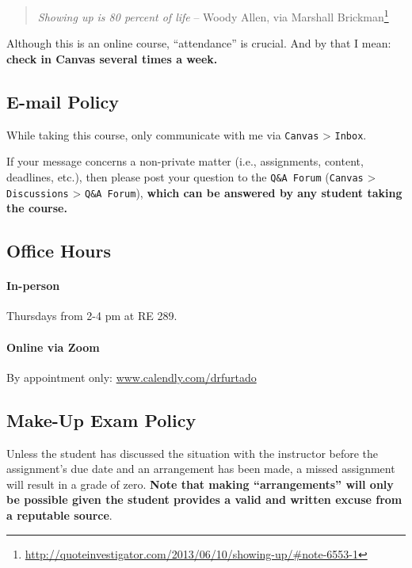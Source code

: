 \documentclass[
  letterpaper,
  DIV=11,
  numbers=noendperiod]{scrartcl}
\let\oldparagraph\paragraph
\renewcommand{\paragraph}[1]{\oldparagraph{#1}\mbox{}}
\DeclareRobustCommand{\href}[2]{#2\footnote{\url{#1}}}
\begin{document}
\begin{quote}
\emph{Showing up is 80 percent of life} -- Woody Allen,
\href{http://quoteinvestigator.com/2013/06/10/showing-up/\#note-6553-1}{via
Marshall Brickman}
\end{quote}

Although this is an online course, ``attendance'' is crucial. And by
that I mean: \textbf{check in Canvas several times a week.}

\hypertarget{e-mail-policy}{%
\subsection{E-mail Policy}\label{e-mail-policy}}

While taking this course, only communicate with me via \texttt{Canvas}
\textgreater{} \texttt{Inbox}.

If your message concerns a non-private matter (i.e., assignments,
content, deadlines, etc.), then please post your question to the
\texttt{Q\&A\ Forum} (\texttt{Canvas} \textgreater{}
\texttt{Discussions} \textgreater{} \texttt{Q\&A\ Forum}), \textbf{which
can be answered by any student taking the course.}

\hypertarget{sec-office-hours}{%
\subsection{Office Hours}\label{sec-office-hours}}

\hypertarget{in-person}{%
\paragraph{In-person}\label{in-person}}

Thursdays from 2-4 pm at RE 289.

\hypertarget{online-via-zoom}{%
\paragraph{Online via Zoom}\label{online-via-zoom}}

By appointment only: \url{www.calendly.com/drfurtado}

\hypertarget{make-up-exam-policy}{%
\subsection{Make-Up Exam Policy}\label{make-up-exam-policy}}

Unless the student has discussed the situation with the instructor
before the assignment's due date and an arrangement has been made, a
missed assignment will result in a grade of zero. \textbf{Note that
making ``arrangements'' will only be possible given the student provides
a valid and written excuse from a reputable source}.
\end{document}
